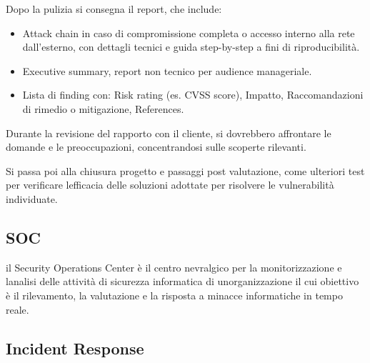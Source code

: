\documentclass[
]{article}
\providecommand{\tightlist}{%
  \setlength{\itemsep}{0pt}\setlength{\parskip}{0pt}}
\begin{document}
{}

{}

{Dopo la pulizia si }{consegna il report}{, che include:}

\begin{itemize}
\tightlist
\item
  {Attack chain in caso di compromissione completa o accesso interno
  alla rete dall'esterno, con dettagli tecnici e guida step-by-step a
  fini di riproducibilità.}
\end{itemize}

{}

\begin{itemize}
\tightlist
\item
  {Executive summary, report non tecnico per audience manageriale.}
\end{itemize}

{}

\begin{itemize}
\tightlist
\item
  {Lista di finding con: Risk rating (es. CVSS score), Impatto,
  Raccomandazioni di rimedio o mitigazione, References.}
\end{itemize}

{}

{Durante la revisione del rapporto con il cliente, si dovrebbero
affrontare le domande e le preoccupazioni, concentrandosi sulle scoperte
rilevanti.}

{}

{}

{Si passa poi alla }{chiusura progetto e passaggi post valutazione}{,
come }{ulteriori test per verificare l\textquotesingle efficacia delle
soluzioni adottate per risolvere le vulnerabilità individuate.}

\subsection{\texorpdfstring{{SOC}}{SOC}}\label{h.ojygza4he5aa}

{il Security Operations Center è il centro nevralgico per la
monitorizzazione e l\textquotesingle analisi delle attività di sicurezza
informatica di un\textquotesingle organizzazione il cui obiettivo è il
rilevamento, la valutazione e la risposta a minacce informatiche in
tempo reale.}

\subsection{\texorpdfstring{{Incident
Response}}{Incident Response}}\label{h.8vyhlm9axmh0}
\end{document}
